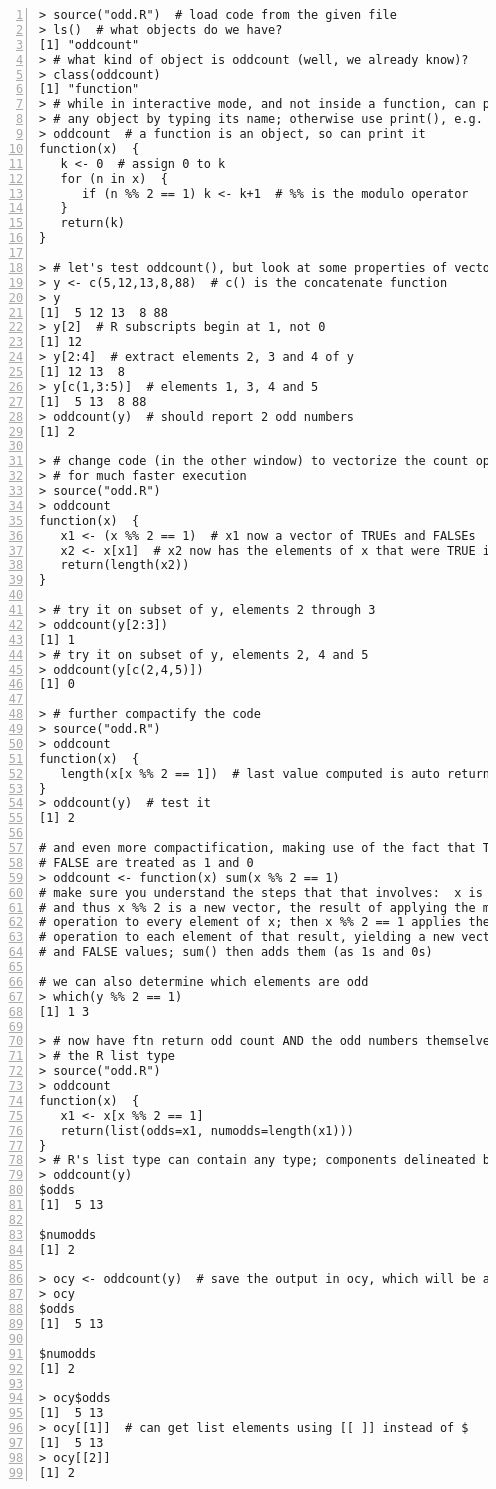 \begin{lstlisting}[numbers=left]
> source("odd.R")  # load code from the given file
> ls()  # what objects do we have?
[1] "oddcount"
> # what kind of object is oddcount (well, we already know)?
> class(oddcount)
[1] "function"
> # while in interactive mode, and not inside a function, can print
> # any object by typing its name; otherwise use print(), e.g. print(x+y)
> oddcount  # a function is an object, so can print it
function(x)  {
   k <- 0  # assign 0 to k
   for (n in x)  {
      if (n %% 2 == 1) k <- k+1  # %% is the modulo operator
   }
   return(k)
}

> # let's test oddcount(), but look at some properties of vectors first
> y <- c(5,12,13,8,88)  # c() is the concatenate function
> y
[1]  5 12 13  8 88
> y[2]  # R subscripts begin at 1, not 0
[1] 12
> y[2:4]  # extract elements 2, 3 and 4 of y
[1] 12 13  8
> y[c(1,3:5)]  # elements 1, 3, 4 and 5
[1]  5 13  8 88
> oddcount(y)  # should report 2 odd numbers
[1] 2

> # change code (in the other window) to vectorize the count operation,
> # for much faster execution
> source("odd.R")
> oddcount
function(x)  {
   x1 <- (x %% 2 == 1)  # x1 now a vector of TRUEs and FALSEs
   x2 <- x[x1]  # x2 now has the elements of x that were TRUE in x1
   return(length(x2))
}

> # try it on subset of y, elements 2 through 3
> oddcount(y[2:3])
[1] 1
> # try it on subset of y, elements 2, 4 and 5
> oddcount(y[c(2,4,5)])
[1] 0

> # further compactify the code
> source("odd.R")
> oddcount
function(x)  {
   length(x[x %% 2 == 1])  # last value computed is auto returned
}
> oddcount(y)  # test it
[1] 2

# and even more compactification, making use of the fact that TRUE and
# FALSE are treated as 1 and 0
> oddcount <- function(x) sum(x %% 2 == 1)
# make sure you understand the steps that that involves:  x is a vector,
# and thus x %% 2 is a new vector, the result of applying the mod 2
# operation to every element of x; then x %% 2 == 1 applies the == 1
# operation to each element of that result, yielding a new vector of TRUE
# and FALSE values; sum() then adds them (as 1s and 0s)

# we can also determine which elements are odd
> which(y %% 2 == 1)
[1] 1 3

> # now have ftn return odd count AND the odd numbers themselves, using
> # the R list type
> source("odd.R")
> oddcount
function(x)  {
   x1 <- x[x %% 2 == 1]
   return(list(odds=x1, numodds=length(x1)))
}
> # R's list type can contain any type; components delineated by $
> oddcount(y)
$odds
[1]  5 13

$numodds
[1] 2

> ocy <- oddcount(y)  # save the output in ocy, which will be a list
> ocy
$odds
[1]  5 13

$numodds
[1] 2

> ocy$odds
[1]  5 13
> ocy[[1]]  # can get list elements using [[ ]] instead of $
[1]  5 13
> ocy[[2]]
[1] 2
\end{lstlisting}

